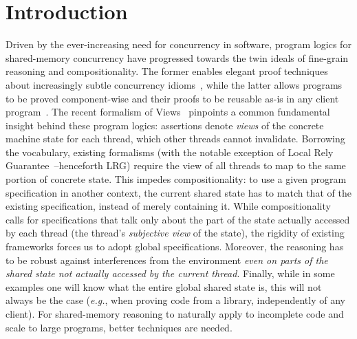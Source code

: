 \section{Introduction}





Driven by the ever-increasing need for concurrency in software,
program logics for shared-memory concurrency have progressed towards
the twin ideals of fine-grain reasoning and compositionality. The
former enables elegant proof techniques about increasingly subtle
concurrency idioms~\cite{vv06popl,vv07msc,todo}, while the latter
allows programs to be proved component-wise and their proofs to be
reusable as-is in any client
program~\cite{csl-tcs,cap-ecoop10,icap}.
The recent formalism of Views~\cite{views} pinpoints a common
fundamental insight behind these program logics: assertions denote
\emph{views} of the concrete machine state for each thread, which
other threads cannot invalidate. Borrowing the vocabulary, existing
formalisms (with the notable exception of Local Rely
Guarantee~\cite{lrg}--henceforth LRG) require the view of all threads
to map to the same portion of concrete state. This impedes
compositionality: to use a given program specification in another
context, the current shared state has to match that of the existing
specification, instead of merely containing it.  While
compositionality calls for specifications that talk only about the
part of the state actually accessed by each thread (the thread's
\emph{subjective view} of the state), the rigidity of existing
frameworks forces us to adopt global specifications. Moreover, the
reasoning has to be robust against interferences from the environment
\emph{even on parts of the shared state not actually accessed by the
  current thread}. Finally, while in some examples one will know what
the entire global shared state is, this will not always be the case
(\textit{e.g.}, when proving code from a library, independently of any
client). For shared-memory reasoning to naturally apply to incomplete
code and scale to large programs, better techniques are needed.

